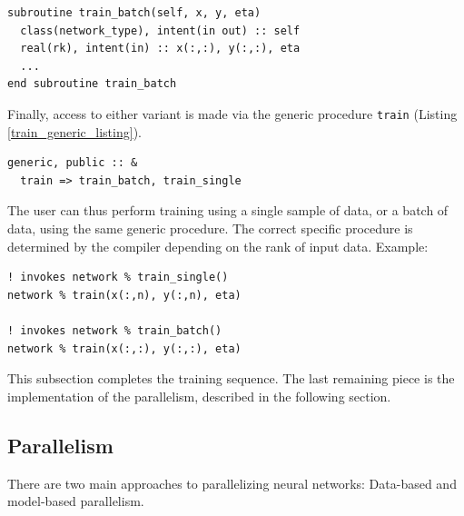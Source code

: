 \documentclass[sigplan, review=false, screen=true, balance=true]{acmart}
\begin{document}
\begin{minipage}{\linewidth}
\begin{lstlisting}[caption={A variant of the training method that accepts batches of data.}, captionpos=b, label={train_batch_listing}]
subroutine train_batch(self, x, y, eta)
  class(network_type), intent(in out) :: self
  real(rk), intent(in) :: x(:,:), y(:,:), eta
  ...
end subroutine train_batch
\end{lstlisting}
\end{minipage}

Finally, access to either variant is made via the generic procedure
\lstinline{train} (Listing \ref{train_generic_listing}).

\begin{minipage}{\linewidth}
\begin{lstlisting}[caption={Overloading specific training procedures with a generic name.}, captionpos=b, label={train_generic_listing}]
generic, public :: &
  train => train_batch, train_single
\end{lstlisting}
\end{minipage}

The user can thus perform training using a single sample of data,
or a batch of data, using the same generic procedure. The correct
specific procedure is determined by the compiler depending on the rank of
input data. Example:

\begin{minipage}{\linewidth}
\begin{lstlisting}[caption={Using the generic training procedure with single samples and batches of data.}, captionpos=b, label={train_generic_usage_listing}]
! invokes network % train_single()
network % train(x(:,n), y(:,n), eta)

! invokes network % train_batch()
network % train(x(:,:), y(:,:), eta)
\end{lstlisting}
\end{minipage}

This subsection completes the training sequence. The last remaining piece
is the implementation of the parallelism, described in the following section.

\subsection{Parallelism}

There are two main approaches to parallelizing neural networks:
Data-based and model-based parallelism.
\end{document}
